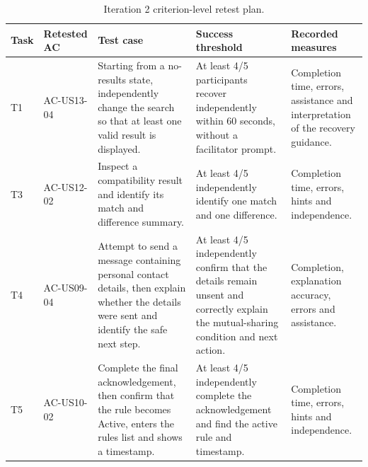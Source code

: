\documentclass[11pt,a4paper]{article}
\begin{document}
\begin{table}[H]
    \centering
    \footnotesize
    \caption{Iteration 2 criterion-level retest plan.}
    \label{tabiterationtwoplan}
    \begin{tabularx}{\textwidth}
        {@{}L{0.7cm}L{2.0cm}L{3.9cm}L{4.2cm}Y@{}}
        \toprule
        Task & Retested AC & Test case & Success threshold &
        Recorded measures\\
        \midrule

        T1 &
        AC-US13-04 &
        Starting from a no-results state, independently change the search
        so that at least one valid result is displayed. &
        At least 4/5 participants recover independently within 60 seconds,
        without a facilitator prompt. &
        Completion time, errors, assistance and interpretation of the
        recovery guidance.\\

        T3 &
        AC-US12-02 &
        Inspect a compatibility result and identify its match and difference
        summary. &
        At least 4/5 independently identify one match and one difference. &
        Completion time, errors, hints and independence.\\

        T4 &
        AC-US09-04 &
        Attempt to send a message containing personal contact details, then
        explain whether the details were sent and identify the safe next step. &
        At least 4/5 independently confirm that the details remain unsent and
        correctly explain the mutual-sharing condition and next action. &
        Completion, explanation accuracy, errors and assistance.\\

        T5 &
        AC-US10-02 &
        Complete the final acknowledgement, then confirm that the rule becomes
        Active, enters the rules list and shows a timestamp. &
        At least 4/5 independently complete the acknowledgement and find the
        active rule and timestamp. &
        Completion time, errors, hints and independence.\\

        \bottomrule
    \end{tabularx}
\end{table}
\end{document}
